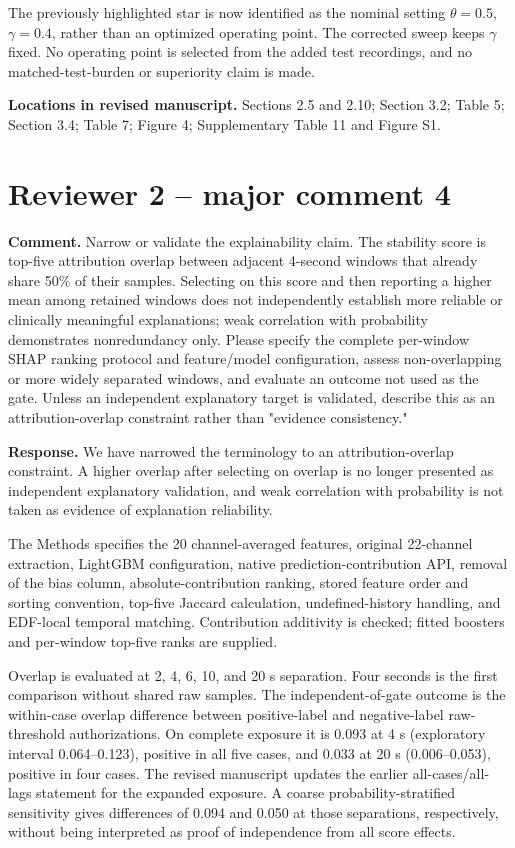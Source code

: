 \documentclass[11pt,a4paper]{article}
\begin{document}
The previously highlighted star is now identified as the nominal setting $\theta=0.5$, $\gamma=0.4$, rather than an optimized operating point. The corrected sweep keeps $\gamma$ fixed. No operating point is selected from the added test recordings, and no matched-test-burden or superiority claim is made.

\textbf{Locations in revised manuscript.} Sections 2.5 and 2.10; Section 3.2; Table 5; Section 3.4; Table 7; Figure 4; Supplementary Table 11 and Figure S1.

\section*{Reviewer 2 -- major comment 4}

\textbf{Comment.} Narrow or validate the explainability claim. The stability score is top-five attribution overlap between adjacent 4-second windows that already share 50\% of their samples. Selecting on this score and then reporting a higher mean among retained windows does not independently establish more reliable or clinically meaningful explanations; weak correlation with probability demonstrates nonredundancy only. Please specify the complete per-window SHAP ranking protocol and feature/model configuration, assess non-overlapping or more widely separated windows, and evaluate an outcome not used as the gate. Unless an independent explanatory target is validated, describe this as an attribution-overlap constraint rather than "evidence consistency."

\textbf{Response.} We have narrowed the terminology to an attribution-overlap constraint. A higher overlap after selecting on overlap is no longer presented as independent explanatory validation, and weak correlation with probability is not taken as evidence of explanation reliability.

The Methods specifies the 20 channel-averaged features, original 22-channel extraction, LightGBM configuration, native prediction-contribution API, removal of the bias column, absolute-contribution ranking, stored feature order and sorting convention, top-five Jaccard calculation, undefined-history handling, and EDF-local temporal matching. Contribution additivity is checked; fitted boosters and per-window top-five ranks are supplied.

Overlap is evaluated at 2, 4, 6, 10, and 20 s separation. Four seconds is the first comparison without shared raw samples. The independent-of-gate outcome is the within-case overlap difference between positive-label and negative-label raw-threshold authorizations. On complete exposure it is 0.093 at 4 s (exploratory interval 0.064--0.123), positive in all five cases, and 0.033 at 20 s (0.006--0.053), positive in four cases. The revised manuscript updates the earlier all-cases/all-lags statement for the expanded exposure. A coarse probability-stratified sensitivity gives differences of 0.094 and 0.050 at those separations, respectively, without being interpreted as proof of independence from all score effects.
\end{document}
